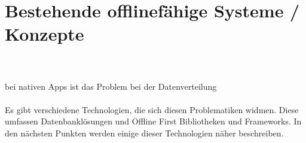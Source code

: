 \chapter{\label{chap:state}Bestehende offlinefähige Systeme / Konzepte}
\\
\\
bei nativen Apps ist das Problem bei der Datenverteilung\\\\
%
%
Es gibt verschiedene Technologien, die sich diesen Problematiken widmen.
Diese umfassen Datenbanklösungen und Offline First Bibliotheken und Frameworks. In den nächsten Punkten werden einige dieser Technologien näher beschreiben.
%
%

%
%

%
%

%
%

%
%

